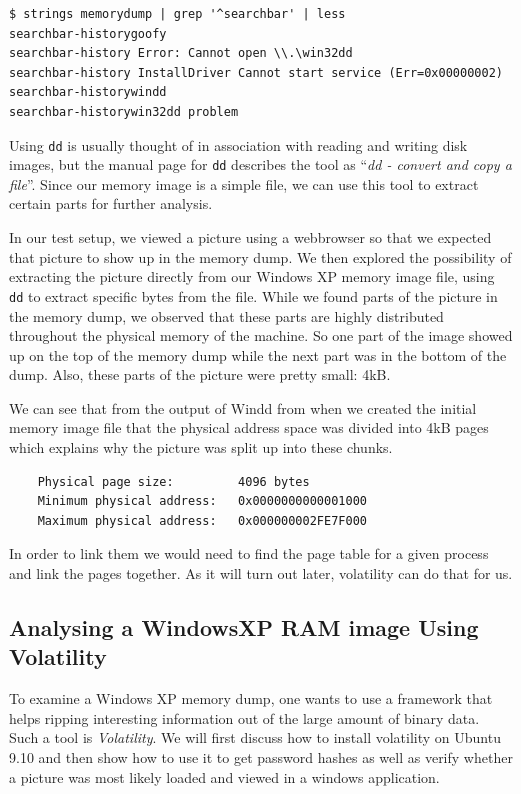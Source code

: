 \documentclass[a4paper,
    11pt,
    normalheadings,
    parindent,
    UKenglish,
    abstracton,
    ]{scrartcl}
\newcommand{\inlinequote}[1]{``\textit{#1}''}
\begin{document}
\begin{verbatim}
$ strings memorydump | grep '^searchbar' | less
searchbar-historygoofy
searchbar-history Error: Cannot open \\.\win32dd
searchbar-history InstallDriver Cannot start service (Err=0x00000002)
searchbar-historywindd
searchbar-historywin32dd problem
\end{verbatim}





Using \texttt{dd} is usually thought of in association with reading and writing disk images, but the manual page for \texttt{dd} describes the tool as \inlinequote{dd - convert and copy a file}.
Since our memory image is a simple file, we can use this tool to extract certain parts for further analysis.

In our test setup, we viewed a picture using a webbrowser so that we expected that picture to show up in the memory dump.
We then explored the possibility of extracting the picture directly from our Windows XP memory image file, using \texttt{dd} to extract specific bytes from the file.
While we found parts of the picture in the memory dump, we observed that these parts are highly distributed throughout the physical memory of the machine.
So one part of the image showed up on the top of the memory dump while the next part was in the bottom of the dump.
Also, these parts of the picture were pretty small: 4kB.

We can see that from the output of Windd from when we created the initial memory image file that the physical address space was divided into 4kB pages which explains why the picture was split up into these chunks.
\begin{verbatim}
    Physical page size:         4096 bytes
    Minimum physical address:   0x0000000000001000
    Maximum physical address:   0x000000002FE7F000
\end{verbatim}

In order to link them we would need to find the page table for a given process and link the pages together.
As it will turn out later, volatility can do that for us.








\subsection{Analysing a WindowsXP RAM image  Using Volatility}
To examine a Windows XP memory dump, one wants to use a framework that helps ripping interesting information out of the large amount of binary data.
Such a tool is \emph{Volatility}.
We will first discuss how to install volatility on Ubuntu 9.10 and then show how to use it to get password hashes as well as verify whether a picture was most likely loaded and viewed in a windows application.
\end{document}
